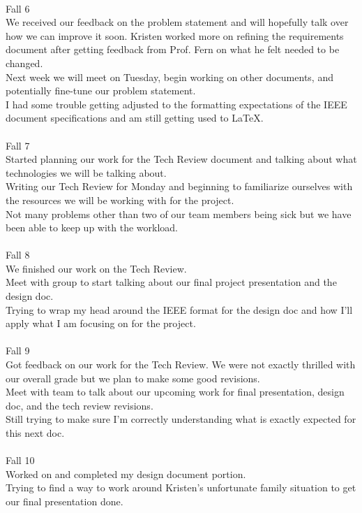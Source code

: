 \documentclass[10pt,letterpaper,onecolumn,draftclsnofoot]{IEEEtran}
\begin{document}
\\
Fall 6\\
We received our feedback on the problem statement and will hopefully talk over how we can improve it soon. Kristen worked more on refining the requirements document after getting feedback from Prof. Fern on what he felt needed to be changed.\\ Next week we will meet on Tuesday, begin working on other documents, and potentially fine-tune our problem statement.\\ I had some trouble getting adjusted to the formatting expectations of the IEEE document specifications and am still getting used to LaTeX.\\
\\
Fall 7\\
Started planning our work for the Tech Review document and talking about what technologies we will be talking about.\\ Writing our Tech Review for Monday and beginning to familiarize ourselves with the resources we will be working with for the project.\\ Not many problems other than two of our team members being sick but we have been able to keep up with the workload.\\
\\
Fall 8\\
We finished our work on the Tech Review.\\ Meet with group to start talking about our final project presentation and the design doc.\\ Trying to wrap my head around the IEEE format for the design doc and how I'll apply what I am focusing on for the project.\\
\\
Fall 9\\
Got feedback on our work for the Tech Review. We were not exactly thrilled with our overall grade but we plan to make some good revisions.\\ Meet with team to talk about our upcoming work for final presentation, design doc, and the tech review revisions.\\ Still trying to make sure I'm correctly understanding what is exactly expected for this next doc.\\
\\
Fall 10\\
Worked on and completed my design document portion.\\ Trying to find a way to work around Kristen's unfortunate family situation to get our final presentation done.\\
\end{document}
